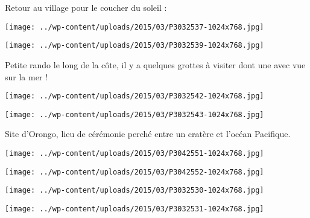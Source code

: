 Retour au village pour le coucher du soleil :
\begin{center} \texttt{[image: ../wp-content/uploads/2015/03/P3032537-1024x768.jpg]} \end{center}
\begin{center} \texttt{[image: ../wp-content/uploads/2015/03/P3032539-1024x768.jpg]} \end{center}

 Petite rando le long de la côte, il y a quelques grottes à visiter dont une avec vue sur la mer !
\begin{center} \texttt{[image: ../wp-content/uploads/2015/03/P3032542-1024x768.jpg]} \end{center}
\begin{center} \texttt{[image: ../wp-content/uploads/2015/03/P3032543-1024x768.jpg]} \end{center}

 Site d'Orongo, lieu de cérémonie perché entre un cratère et l'océan Pacifique.
\begin{center} \texttt{[image: ../wp-content/uploads/2015/03/P3042551-1024x768.jpg]} \end{center}
\begin{center} \texttt{[image: ../wp-content/uploads/2015/03/P3042552-1024x768.jpg]} \end{center}
\begin{center} \texttt{[image: ../wp-content/uploads/2015/03/P3032530-1024x768.jpg]} \end{center}
\begin{center} \texttt{[image: ../wp-content/uploads/2015/03/P3032531-1024x768.jpg]} \end{center}